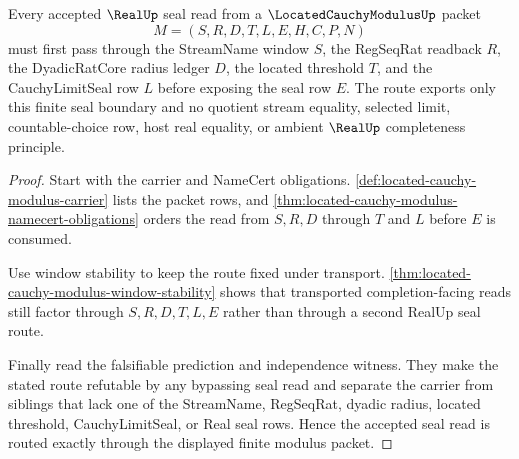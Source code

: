 \begin{theorem}
\label{thm:located-cauchy-modulus-seal-routing}
Every accepted $\RealUp$ seal read from a $\LocatedCauchyModulusUp$ packet
$$
M=(S,R,D,T,L,E,H,C,P,N)
$$
must first pass through the StreamName window $S$, the RegSeqRat readback $R$, the DyadicRatCore radius ledger $D$, the located threshold $T$, and the CauchyLimitSeal row $L$ before exposing the seal row $E$. The route exports only this finite seal boundary and no quotient stream equality, selected limit, countable-choice row, host real equality, or ambient $\RealUp$ completeness principle.
\end{theorem}
\begin{proof}
Start with the carrier and NameCert obligations. \autoref{def:located-cauchy-modulus-carrier} lists the packet rows, and \autoref{thm:located-cauchy-modulus-namecert-obligations} orders the read from $S,R,D$ through $T$ and $L$ before $E$ is consumed.

Use window stability to keep the route fixed under transport. \autoref{thm:located-cauchy-modulus-window-stability} shows that transported completion-facing reads still factor through $S,R,D,T,L,E$ rather than through a second RealUp seal route.

Finally read the falsifiable prediction and independence witness. They make the stated route refutable by any bypassing seal read and separate the carrier from siblings that lack one of the StreamName, RegSeqRat, dyadic radius, located threshold, CauchyLimitSeal, or Real seal rows. Hence the accepted seal read is routed exactly through the displayed finite modulus packet.
\end{proof}



